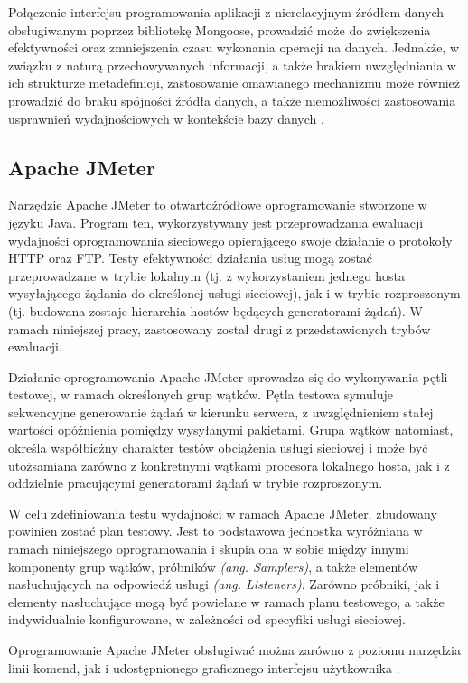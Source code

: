 Połączenie interfejsu programowania aplikacji z nierelacyjnym źródłem danych obsługiwanym poprzez bibliotekę Mongoose, prowadzić może do zwiększenia efektywności oraz zmniejszenia czasu wykonania operacji na danych. Jednakże, w związku z naturą przechowywanych informacji, a także brakiem uwzględniania w ich strukturze metadefinicji, zastosowanie omawianego mechanizmu może również prowadzić do braku spójności źródła danych, a także niemożliwości zastosowania usprawnień wydajnościowych w kontekście bazy danych \cite{holmes2013mongoose}.  
\subsection*{Apache JMeter}
Narzędzie Apache JMeter to otwartoźródłowe oprogramowanie stworzone w języku Java. Program ten, wykorzystywany jest przeprowadzania ewaluacji wydajności oprogramowania sieciowego opierającego swoje działanie o protokoły HTTP oraz FTP. Testy efektywności działania usług mogą zostać przeprowadzane w trybie lokalnym (tj. z wykorzystaniem jednego hosta wysyłającego żądania do określonej usługi sieciowej), jak i w trybie rozproszonym (tj. budowana zostaje hierarchia hostów będących generatorami żądań). W ramach niniejszej pracy, zastosowany został drugi z przedstawionych trybów ewaluacji.

Działanie oprogramowania Apache JMeter sprowadza się do wykonywania pętli testowej, w ramach określonych grup wątków. Pętla testowa symuluje sekwencyjne generowanie żądań w kierunku serwera, z uwzględnieniem stałej wartości opóźnienia pomiędzy wysyłanymi pakietami. Grupa wątków natomiast, określa współbieżny charakter testów obciążenia usługi sieciowej i może być utożsamiana zarówno z konkretnymi wątkami procesora lokalnego hosta, jak i z oddzielnie pracującymi generatorami żądań w trybie rozproszonym.

W celu zdefiniowania testu wydajności w ramach Apache JMeter, zbudowany powinien zostać plan testowy. Jest to podstawowa jednostka wyróżniana w ramach niniejszego oprogramowania i skupia ona w sobie między innymi komponenty grup wątków, próbników \textit{(ang. Samplers)}, a także elementów nasłuchujących na odpowiedź usługi \textit{(ang. Listeners)}. Zarówno próbniki, jak i elementy nasłuchujące mogą być powielane w ramach planu testowego, a także indywidualnie konfigurowane, w zależności od specyfiki usługi sieciowej.

Oprogramowanie Apache JMeter obsługiwać można zarówno z poziomu narzędzia linii komend, jak i udostępnionego graficznego interfejsu użytkownika \cite{halili2008apache}. 
